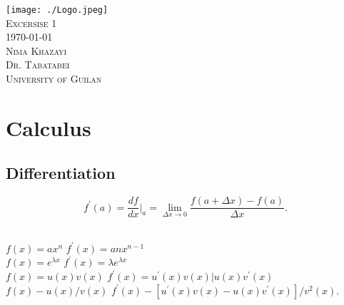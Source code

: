 \documentclass{report}
\begin{document}
\begin{titlepage}
  \centering
  \texttt{[image: ./Logo.jpeg]}\\[1cm]
  \scshape\LARGE Excersise 1\\[2cm]
  \today\\[4cm]
  \scshape\Large Nima Khazayi\\[1cm]
    \scshape\Large Dr. Tabatabei\\[1cm]
  \scshape\large University of Guilan\\[1cm]
\end{titlepage}
\section{Calculus}
\subsection{Differentiation}
	\begin{equation}
		f^{'}(a) = \frac{df}{dx}|_a = \lim_{\Delta x \to 0}\frac{f(a+\Delta x) - f(a)}{\Delta x}.
	\end{equation}
 
\\

\hspace{2cm}$f(x) = ax^n$ \hspace{2cm} $f^{'}(x) = anx^{n-1}$\\

\hspace{2cm}$f(x) = e^{\lambda x}$ \hspace{2.05cm} $f^{'}(x) = \lambda e^{\lambda x}$\\

\hspace{2cm}$f(x) = u(x)v(x)$ \hspace{1.2cm} $f^{'}(x) = u^{'}(x)v(x) | u(x)v^{'}(x)$\\

\hspace{2cm}$f(x) - u(x)/v(x)$ \hspace{1.2cm} $f^{'}(x) - [u^{'}(x)v(x) - u(x)v^{'}(x)]/v^2(x).$\\
\end{document}
